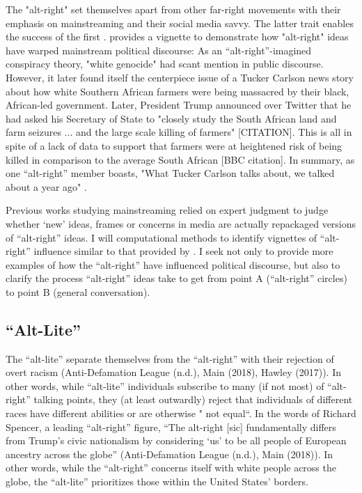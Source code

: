 \documentclass[acmlarge, screen, authorversion]{acmart}
\begin{document}
The "alt-right" set themselves apart from other far-right movements with their emphasis on mainstreaming and their social media savvy. The latter trait enables the success of the first \cite{sternProudBoysWhite2019, nagleKillAllNormies2017, gallaherMainstreamingWhiteSupremacy2020}. 
\citet{sternProudBoysWhite2019} provides a vignette to demonstrate how "alt-right" ideas have warped mainstream political discourse: As an ``alt-right''-imagined conspiracy theory, "white genocide" had scant mention in public discourse. However, it later found itself the centerpiece issue of a Tucker Carlson news story about how white Southern African farmers were being massacred by their black, African-led government. Later, President Trump announced over Twitter that he had asked his Secretary of State to "closely study the South African land and farm seizures ... and the large scale killing of farmers" [CITATION]. This is all in spite of a lack of data to support that farmers were at heightened risk of being killed in comparison to the average South African [BBC citation]. In summary, as one ``alt-right'' member boasts, "What Tucker Carlson talks about, we talked about a year ago" \cite{janetreitmanLawEnforcementFailed2018}.

Previous works studying mainstreaming relied on expert judgment to judge
whether `new' ideas, frames or concerns in media are actually repackaged
versions of ``alt-right'' ideas. I will computational methods to identify
vignettes of ``alt-right'' influence similar to that provided by
\citet{sternProudBoysWhite2019}. I seek not only to provide more examples of
how the ``alt-right'' have influenced political discourse, but also to clarify
the process ``alt-right'' ideas take to get from point A (``alt-right''
circles) to point B (general conversation).

\subsection{“Alt-Lite”}

The “alt-lite” separate themselves from the “alt-right” with their
rejection of overt racism (Anti-Defamation League (n.d.), Main (2018),
Hawley (2017)). In other words, while “alt-lite” individuals subscribe
to many (if not most) of “alt-right” talking points, they (at least
outwardly) reject that individuals of different races have different
abilities or are otherwise " not equal“. In the words of Richard
Spencer, a leading ``alt-right'' figure, “The alt-right [sic] fundamentally
differs from Trump’s civic nationalism by considering ‘us’ to be all
people of European ancestry across the globe” (Anti-Defamation League
(n.d.), Main (2018)). In other words, while the “alt-right” concerns
itself with white people across the globe, the “alt-lite” prioritizes
those within the United States’ borders.
\end{document}
